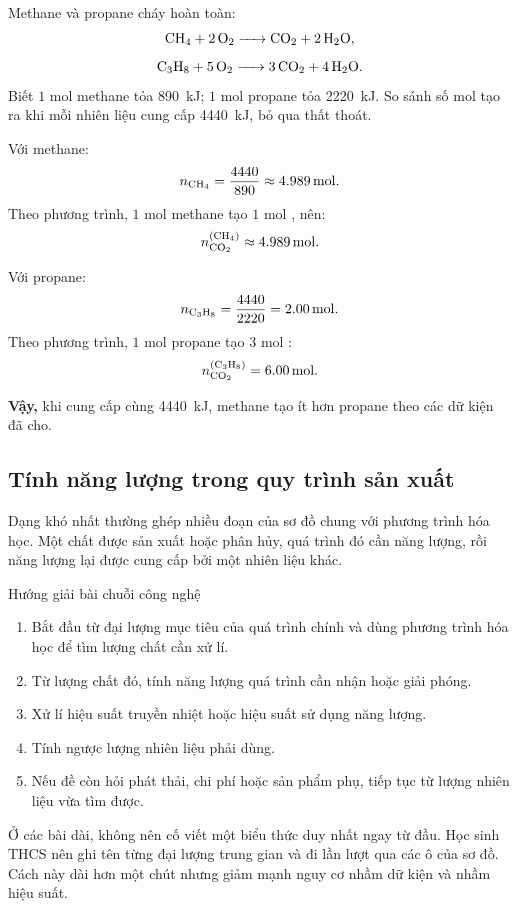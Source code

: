 \begin{vidu}
Methane và propane cháy hoàn toàn:
\[
\ce{CH4 + 2O2 -> CO2 + 2H2O},
\]
\[
\ce{C3H8 + 5O2 -> 3CO2 + 4H2O}.
\]
Biết $1$ mol methane tỏa \SI{890}{\kilo\joule}; $1$ mol propane tỏa \SI{2220}{\kilo\joule}. So sánh số mol  tạo ra khi mỗi nhiên liệu cung cấp \SI{4440}{\kilo\joule}, bỏ qua thất thoát.
\end{vidu}
\begin{loigiai}
Với methane:
\[
n_{\ce{CH4}}=\frac{4440}{890}\approx\SI{4.989}{\mole}.
\]
Theo phương trình, $1$ mol methane tạo $1$ mol , nên:
\[
n_{\ce{CO2}}^{(\ce{CH4})}\approx\SI{4.989}{\mole}.
\]

Với propane:
\[
n_{\ce{C3H8}}=\frac{4440}{2220}=\SI{2.00}{\mole}.
\]
Theo phương trình, $1$ mol propane tạo $3$ mol :
\[
n_{\ce{CO2}}^{(\ce{C3H8})}=\SI{6.00}{\mole}.
\]

\textbf{Vậy,} khi cung cấp cùng \SI{4440}{\kilo\joule}, methane tạo ít  hơn propane theo các dữ kiện đã cho.
\end{loigiai}

\subsection{Tính năng lượng trong quy trình sản xuất}

Dạng khó nhất thường ghép nhiều đoạn của sơ đồ chung với phương trình hóa học. Một chất được sản xuất hoặc phân hủy, quá trình đó cần năng lượng, rồi năng lượng lại được cung cấp bởi một nhiên liệu khác.

\begin{ghinho}{Hướng giải bài chuỗi công nghệ}
\begin{enumerate}
\item Bắt đầu từ đại lượng mục tiêu của quá trình chính và dùng phương trình hóa học để tìm lượng chất cần xử lí.
\item Từ lượng chất đó, tính năng lượng quá trình cần nhận hoặc giải phóng.
\item Xử lí hiệu suất truyền nhiệt hoặc hiệu suất sử dụng năng lượng.
\item Tính ngược lượng nhiên liệu phải dùng.
\item Nếu đề còn hỏi phát thải, chi phí hoặc sản phẩm phụ, tiếp tục từ lượng nhiên liệu vừa tìm được.
\end{enumerate}
\end{ghinho}

\begin{notechem}
Ở các bài dài, không nên cố viết một biểu thức duy nhất ngay từ đầu. Học sinh THCS nên ghi tên từng đại lượng trung gian và đi lần lượt qua các ô của sơ đồ. Cách này dài hơn một chút nhưng giảm mạnh nguy cơ nhầm dữ kiện và nhầm hiệu suất.
\end{notechem}
